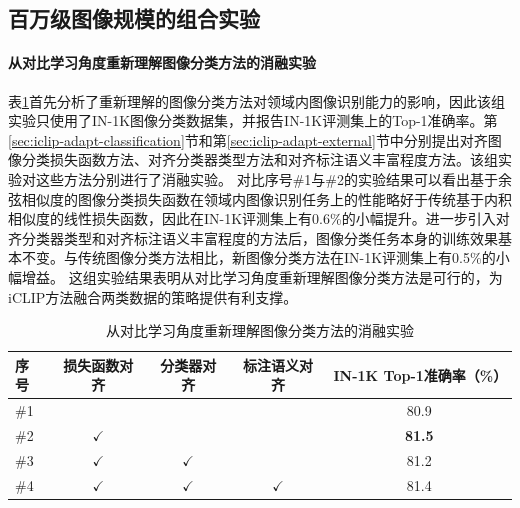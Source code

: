 \subsection{百万级图像规模的组合实验}

\paragraph{从对比学习角度重新理解图像分类方法的消融实验}
表\ref{tab:iclip-ablate_head}首先分析了重新理解的图像分类方法对领域内图像识别能力的影响，因此该组实验只使用了IN-1K图像分类数据集，并报告IN-1K评测集上的Top-1准确率。第\ref{sec:iclip-adapt-classification}节和第\ref{sec:iclip-adapt-external}节中分别提出对齐图像分类损失函数方法、对齐分类器类型方法和对齐标注语义丰富程度方法。该组实验对这些方法分别进行了消融实验。%
对比序号\#1与\#2的实验结果可以看出基于余弦相似度的图像分类损失函数在领域内图像识别任务上的性能略好于传统基于内积相似度的线性损失函数，因此在IN-1K评测集上有0.6\%的小幅提升。进一步引入对齐分类器类型和对齐标注语义丰富程度的方法后，图像分类任务本身的训练效果基本不变。与传统图像分类方法相比，新图像分类方法在IN-1K评测集上有0.5\%的小幅增益。
这组实验结果表明从对比学习角度重新理解图像分类方法是可行的，为iCLIP方法融合两类数据的策略提供有利支撑。

\begin{table}
  \centering
\caption{从对比学习角度重新理解图像分类方法的消融实验}
  \begin{tabular}{lcccc}
    \toprule
    序号 & 损失函数对齐 & 分类器对齐 & 标注语义对齐 & IN-1K Top-1准确率（\%） \\
    \midrule
    \#1 & & & & 80.9  \\
    \#2 & $\checkmark$ & & & \textbf{81.5} \\
    \#3 & $\checkmark$ & $\checkmark$ & & 81.2  \\
    \#4 & $\checkmark$ & $\checkmark$ & $\checkmark$ & 81.4 \\
    \bottomrule
  \end{tabular}
  \label{tab:iclip-ablate_head}
\end{table}

